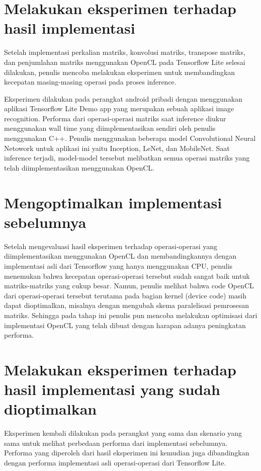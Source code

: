 \section{Melakukan eksperimen terhadap hasil implementasi}
Setelah implementasi perkalian matriks, konvolusi matriks, transpose matriks, dan penjumlahan matriks menggunakan OpenCL pada Tensorflow Lite selesai dilakukan, penulis mencoba melakukan eksperimen untuk membandingkan kecepatan masing-masing operasi pada proses inference.

Eksperimen dilakukan pada perangkat android pribadi dengan menggunakan aplikasi Tensorflow Lite Demo app yang merupakan sebuah aplikasi image recognition. Performa dari operasi-operasi matriks saat inference diukur menggunakan wall time yang diimplementasikan sendiri oleh penulis menggunakan C++. Penulis menggunakan beberapa model Convolutional Neural Netowork untuk aplikasi ini yaitu Inception, LeNet, dan MobileNet. Saat inference terjadi, model-model tersebut melibatkan semua operasi matriks yang telah diimplementasikan menggunakan OpenCL.   

\section{Mengoptimalkan implementasi sebelumnya}
Setelah mengevaluasi hasil eksperimen terhadap operasi-operasi yang diimplementasikan menggunakan OpenCL dan membandingkannya dengan implementasi asli dari Tensorflow yang hanya menggunakan CPU, penulis menemukan bahwa kecepatan operasi-operasi tersebut sudah sangat baik untuk matriks-matriks yang cukup besar. Namun, penulis melihat bahwa code OpenCL dari operasi-operasi tersebut terutama pada bagian kernel (device code) masih dapat dioptimalkan, misalnya dengan mengubah skema paralelisasi pemrosesan matriks. Sehingga pada tahap ini penulis pun mencoba melakukan optimisasi dari implementasi OpenCL yang telah dibuat dengan harapan adanya peningkatan performa.

\section{Melakukan eksperimen terhadap hasil implementasi yang sudah dioptimalkan}
Eksperimen kembali dilakukan pada perangkat yang sama dan skenario yang sama untuk melihat perbedaan performa dari implementasi sebelumnya. Performa yang diperoleh dari hasil eksperimen ini kemudian juga dibandingkan dengan performa implementasi asli operasi-operasi \deeplearning \inference dari Tensorflow Lite.


